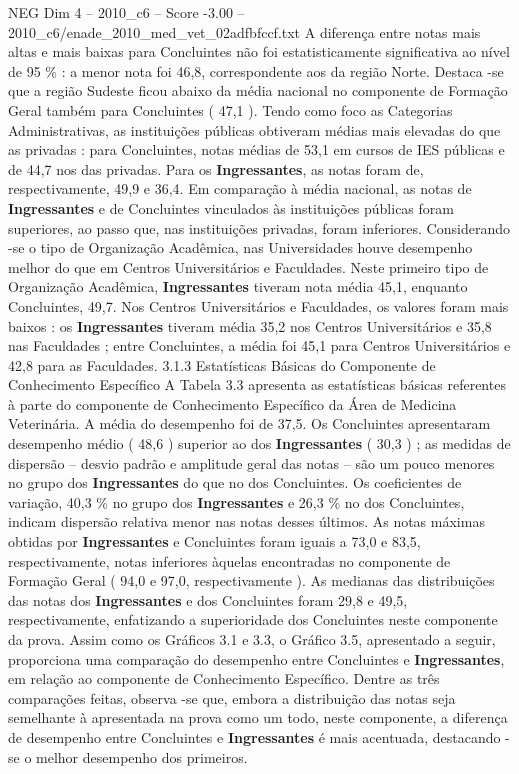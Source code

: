 \begin{textsample}{NEG Dim 4 – 2010\_c6 – Score -3.00 – 2010\_c6/enade\_2010\_med\_vet\_02adfbfccf.txt}
A diferença entre notas mais altas e mais baixas para Concluintes não foi estatisticamente significativa ao nível de 95 \% : a menor nota foi 46,8, correspondente aos da região Norte.
Destaca -se que a região Sudeste ficou abaixo da média nacional no componente de Formação Geral também para Concluintes ( 47,1 ).
Tendo como foco as Categorias Administrativas, as instituições públicas obtiveram médias mais elevadas do que as privadas : para Concluintes, notas médias de 53,1 em cursos de IES públicas e de 44,7 nos das privadas.
Para os \textbf{Ingressantes}, as notas foram de, respectivamente, 49,9 e 36,4.
Em comparação à média nacional, as notas de \textbf{Ingressantes} e de Concluintes vinculados às instituições públicas foram superiores, ao passo que, nas instituições privadas, foram inferiores.
Considerando -se o tipo de Organização Acadêmica, nas Universidades houve desempenho melhor do que em Centros Universitários e Faculdades.
Neste primeiro tipo de Organização Acadêmica, \textbf{Ingressantes} tiveram nota média 45,1, enquanto Concluintes, 49,7.
Nos Centros Universitários e Faculdades, os valores foram mais baixos : os \textbf{Ingressantes} tiveram média 35,2 nos Centros Universitários e 35,8 nas Faculdades ; entre Concluintes, a média foi 45,1 para Centros Universitários e 42,8 para as Faculdades. 3.1.3 Estatísticas Básicas do Componente de Conhecimento Específico A Tabela 3.3 apresenta as estatísticas básicas referentes à parte do componente de Conhecimento Específico da Área de Medicina Veterinária.
A média do desempenho foi de 37,5.
Os Concluintes apresentaram desempenho médio ( 48,6 ) superior ao dos \textbf{Ingressantes} ( 30,3 ) ; as medidas de dispersão – desvio padrão e amplitude geral das notas – são um pouco menores no grupo dos \textbf{Ingressantes} do que no dos Concluintes.
Os coeficientes de variação, 40,3 \% no grupo dos \textbf{Ingressantes} e 26,3 \% no dos Concluintes, indicam dispersão relativa menor nas notas desses últimos.
As notas máximas obtidas por \textbf{Ingressantes} e Concluintes foram iguais a 73,0 e 83,5, respectivamente, notas inferiores àquelas encontradas no componente de Formação Geral ( 94,0 e 97,0, respectivamente ).
As medianas das distribuições das notas dos \textbf{Ingressantes} e dos Concluintes foram 29,8 e 49,5, respectivamente, enfatizando a superioridade dos Concluintes neste componente da prova.
Assim como os Gráficos 3.1 e 3.3, o Gráfico 3.5, apresentado a seguir, proporciona uma comparação do desempenho entre Concluintes e \textbf{Ingressantes}, em relação ao componente de Conhecimento Específico.
Dentre as três comparações feitas, observa -se que, embora a distribuição das notas seja semelhante à apresentada na prova como um todo, neste componente, a diferença de desempenho entre Concluintes e \textbf{Ingressantes} é mais acentuada, destacando -se o melhor desempenho dos primeiros.

\end{textsample}
